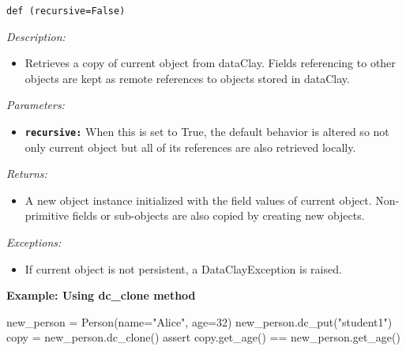 
\begin{dBox}
\texttt{def  (recursive=False)}
\LINE

{\it Description:}

\begin{itemize}
    \item Retrieves a copy of current object from dataClay. Fields referencing to other objects are kept as remote references to objects stored in dataClay.
\end{itemize}

{\it Parameters:}
\begin{itemize}
    \item \texttt{\bfseries recursive:} When this is set to True, the default behavior is altered so not only current object but all of its references are also retrieved locally.
\end{itemize}

{\it Returns:}

\begin{itemize}
    \item A new object instance initialized with the field values of current object. Non-primitive fields or sub-objects are also copied by creating new objects.
\end{itemize}

{\it Exceptions:}

\begin{itemize}
    \item If current object is not persistent, a DataClayException is raised.
\end{itemize}

\end{dBox}

\begin{tBox}
\textcolor{basecolor} {\bf Example: Using dc\_clone method}
\begin{java}
new_person = Person(name="Alice", age=32)
new_person.dc_put("student1")
copy = new_person.dc_clone()
assert copy.get_age() == new_person.get_age()
\end{java}
\end{tBox}



